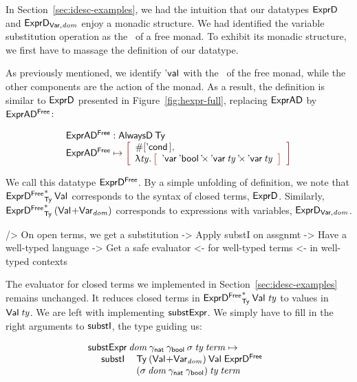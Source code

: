In Section~\ref{sec:idesc-examples}, we had the intuition that our
datatypes $\HExprD$ and $\HExprVarD{\V{dom}}$ enjoy a monadic
structure. We had identified the variable substitution operation as
the \bind\ of a free monad. To exhibit its monadic structure, we first
have to massage the definition of our datatype.

As previously mentioned, we identify $\Eval{\!}$ with the \return\ of
the free monad, while the other components are the action of the
monad. As a result, the definition is similar to $\HExprD$ presented
in Figure~\ref{fig:hexpr-full}, replacing $\HExprAD$ by
$\HExprAFreeD$:

\[\stk{
\HExprAFreeD : \ATagIDesc{\Ty} \\
\HExprAFreeD \mapsto \bigRedBracket{
                 \begin{array}{l}
                   \EnumT{\red{[}\Econd{\!}{\!}{\!}\red{]}} \red{,} \\
                   \LAM{\V{ty}}
                   \bigRedBracket{
                   \begin{array}{l}
                   \DProd{\DVar{\Ebool}}{\DProd{\DVar{\V{ty}}}{\DVar{\V{ty}}}}
                   \end{array}
                   }
                 \end{array}
                 }
}\]

We call this datatype $\HExprFreeD$. By a simple unfolding of
definition, we note that $\FreeIMonad{\HExprFreeD}{\Ty}{\Val{\!}}$
corresponds to the syntax of closed terms, $\HExprD$. Similarly,
$\FreeIMonad{\HExprFreeD}{\Ty}{(\SUM{\Val{\!}}{\Var{\V{dom}}{}})}$
corresponds to expressions with variables, $\HExprVarD{\V{dom}}$.

\begin{wstructure}
    /> On open terms, we get a substitution
        -> Apply substI on assgnmt
            -> Have a well-typed language
            -> Get a safe evaluator 
                <- for well-typed terms 
                <- in well-typed contexts
\end{wstructure}

The evaluator for closed terms we implemented in
Section~\ref{sec:idesc-examples} remains unchanged. It reduces closed
terms in $\FreeIMonad{\HExprFreeD}{\Ty}{\Val{\!}}\: \V{ty}$ to values in
$\Val{\V{ty}}$. We are left with implementing $\substH$. We simply
have to fill in the right arguments to $\substI$, the type guiding us:


\[\stk{
\substH\: \V{dom}\:
          \gammaNat\: \gammaBool\:
          \V{\sigma}\: 
          \V{ty}\: 
          \V{term} \mapsto  \\
\;\;\ \begin{array}{ll}
       \substI\: & \Ty\: 
                  (\SUM{\Val{\!}}{\Var{\V{dom}}{}})\: 
                  \Val{\!}\:
                  \HExprFreeD\:  \\
                &
                  (\V{\sigma}\: \V{dom}\: \gammaNat\: \gammaBool)\:
                  \V{ty}\:
                  \V{term}
      \end{array}
}\]

